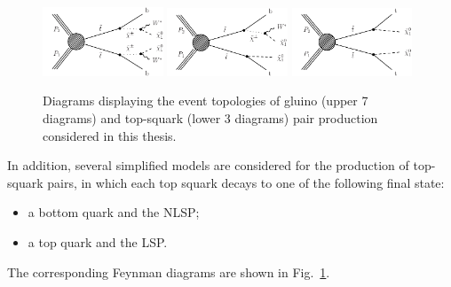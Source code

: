 \begin{figure}[thb!]
\includegraphics[width=0.32\textwidth]{figs/theory/T2bw.pdf}
\includegraphics[width=0.32\textwidth]{figs/theory/T2tb.pdf}
\includegraphics[width=0.32\textwidth]{figs/theory/T2tt.pdf}
\caption{Diagrams displaying the event topologies of gluino (upper 7
  diagrams) and top-squark (lower 3 diagrams) pair production
  considered in this thesis.\label{fig:SMSGluinoTopology}}
\end{figure}


In addition, several simplified models are considered for
the production of top-squark pairs, in which each top squark decays to
one of the following final state:
 \begin{itemize}
\item a bottom quark and the NLSP;
\item a top quark and the LSP.
\end{itemize}
The corresponding Feynman diagrams are shown in
Fig.~\ref{fig:SMSGluinoTopology}.

